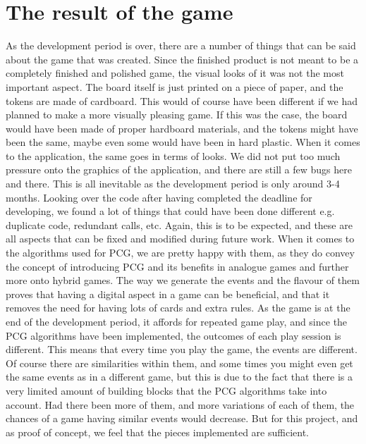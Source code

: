 \section{The result of the game}
As the development period is over, there are a number of things that can be said about the game that was created. Since the finished product is not meant to be a completely finished and polished game, the visual looks of it was not the most important aspect. The board itself is just printed on a piece of paper, and the tokens are made of cardboard. This would of course have been different if we had planned to make a more visually pleasing game. If this was the case, the board would have been made of proper hardboard materials, and the tokens might have been the same, maybe even some would have been in hard plastic. When it comes to the application, the same goes in terms of looks. We did not put too much pressure onto the graphics of the application, and there are still a few bugs here and there. This is all inevitable as the development period is only around 3-4 months. Looking over the code after having completed the deadline for developing, we found a lot of things that could have been done different e.g. duplicate code, redundant calls, etc. Again, this is to be expected, and these are all aspects that can be fixed and modified during future work.
When it comes to the algorithms used for PCG, we are pretty happy with them, as they do convey the concept of introducing PCG and its benefits in analogue games and further more onto hybrid games. The way we generate the events and the flavour of them proves that having a digital aspect in a game can be beneficial, and that it removes the need for having lots of cards and extra rules. As the game is at the end of the development period, it affords for repeated game play, and since the PCG algorithms have been implemented, the outcomes of each play session is different. This means that every time you play the game, the events are different. Of course there are similarities within them, and some times you might even get the same events as in a different game, but this is due to the fact that there is a very limited amount of building blocks that the PCG algorithms take into account. Had there been more of them, and more variations of each of them, the chances of a game having similar events would decrease. But for this project, and as proof of concept, we feel that the pieces implemented are sufficient.

